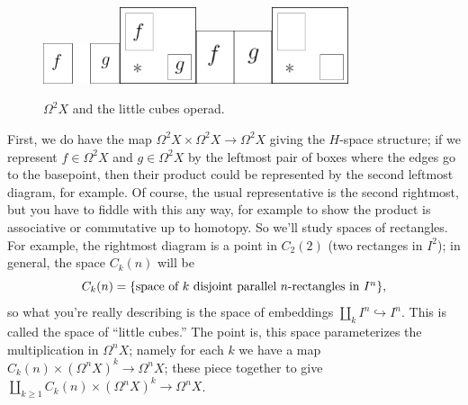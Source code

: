 \documentclass{article}
\newcommand{\Loops}{\Omega}
\newcommand{\into}{\hookrightarrow}
\begin{document}
\begin{figure}[h!]
\centering\includegraphics[width=0.2\textwidth]{figures/figure35-1.pdf}\;\includegraphics[width=0.2\textwidth]{figures/figure35-2.pdf}\;\includegraphics[width=0.2\textwidth]{figures/figure35-3.pdf}\;\includegraphics[width=0.2\textwidth]{figures/figure35-4.pdf}
\caption{\small $\Loops^2 X$ and the little cubes operad.}
\end{figure}
First, we do have the map $\Loops^2 X \times \Loops^2 X \to \Loops^2 X$ giving the $H$-space structure; if we represent $f \in \Loops^2 X$ and $g \in \Loops^2 X$ by the leftmost pair of boxes where the edges go to the basepoint, then their product could be represented by the second leftmost diagram, for example.  Of course, the usual representative is the second rightmost, but you have to fiddle with this any way, for example to show the product is associative or commutative up to homotopy.  So we'll study spaces of rectangles.  For example, the rightmost diagram is a point in $C_2(2)$ (two rectanges in $I^2$); in general, the space $C_k(n)$ will be
\[
C_k(n) = \{ \hbox{space of $k$ disjoint parallel $n$-rectangles in $I^n$} \}
,\]
so what you're really describing is the space of embeddings $\coprod_k I^n \into I^n$.  This is called the space of ``little cubes.''  The point is, this space parameterizes the multiplication in $\Loops^n X$; namely for each $k$ we have a map $C_k(n) \times (\Loops^n X)^k \to \Loops^n X$; these piece together to give $\coprod_{k \ge 1} C_k(n) \times (\Loops^n X)^k \to \Loops^n X$.
\end{document}
